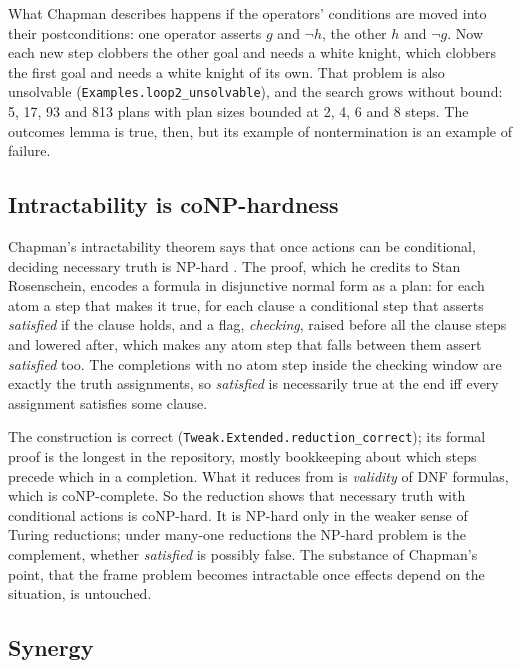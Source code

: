 \documentclass[11pt]{article}
\newcommand{\lean}[1]{\texttt{#1}}
\begin{document}
What Chapman describes happens if the operators' conditions are moved into
their postconditions: one operator asserts $g$ and $\neg h$, the other $h$
and $\neg g$. Now each new step clobbers the other goal and needs a white
knight, which clobbers the first goal and needs a white knight of its own.
That problem is also unsolvable (\lean{Examples.loop2\_unsolvable}), and
the search grows without bound: 5, 17, 93 and 813 plans with plan sizes
bounded at 2, 4, 6 and 8 steps. The outcomes lemma is true, then, but its
example of nontermination is an example of failure.

\subsection{Intractability is coNP-hardness}

Chapman's intractability theorem says that once actions can be
conditional, deciding necessary truth is NP-hard
\citep[pp.~23, 45--46]{chapman1985}. The proof, which he credits to Stan
Rosenschein, encodes a formula in disjunctive normal form as a plan: for
each atom a step that makes it true, for each clause a conditional step
that asserts \emph{satisfied} if the clause holds, and a flag,
\emph{checking}, raised before all the clause steps and lowered after,
which makes any atom step that falls between them assert \emph{satisfied}
too. The completions with no atom step inside the checking window are
exactly the truth assignments, so \emph{satisfied} is necessarily true at
the end iff every assignment satisfies some clause.

The construction is correct (\lean{Tweak.Extended.reduction\_correct});
its formal proof is the longest in the repository, mostly bookkeeping
about which steps precede which in a completion. What it reduces from is
\emph{validity} of DNF formulas, which is coNP-complete. So the reduction
shows that necessary truth with conditional actions is coNP-hard. It is
NP-hard only in the weaker sense of Turing reductions; under many-one
reductions the NP-hard problem is the complement, whether \emph{satisfied}
is possibly false. The substance of Chapman's point, that the frame problem
becomes intractable once effects depend on the situation, is untouched.

\subsection{Synergy}
\end{document}
